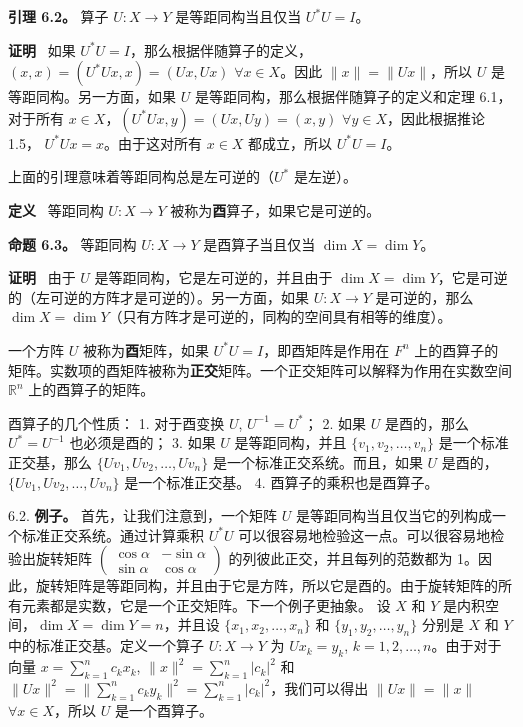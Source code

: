 \textbf{引理 6.2。} 算子 $U: X \to Y$ 是等距同构当且仅当 $U^*U = I$。

\textbf{证明}~ 如果 $U^*U = I$，那么根据伴随算子的定义，$(x, x) = (U^*Ux, x) = (Ux, Ux)$ $\forall x \in X$。因此 $\|x\| = \|Ux\|$，所以 $U$ 是等距同构。另一方面，如果 $U$ 是等距同构，那么根据伴随算子的定义和定理 6.1，对于所有 $x \in X$，$(U^*Ux, y) = (Ux, Uy) = (x, y)$ $\forall y \in X$，因此根据推论 1.5， $U^*Ux = x$。由于这对所有 $x \in X$ 都成立，所以 $U^*U = I$。

上面的引理意味着等距同构总是左可逆的（$U^*$ 是左逆）。

\textbf{定义}~ 等距同构 $U: X \to Y$ 被称为\textbf{酉}算子，如果它是可逆的。

\textbf{命题 6.3。} 等距同构 $U: X \to Y$ 是酉算子当且仅当 $\dim X = \dim Y$。

\textbf{证明}~ 由于 $U$ 是等距同构，它是左可逆的，并且由于 $\dim X = \dim Y$，它是可逆的（左可逆的方阵才是可逆的）。另一方面，如果 $U: X \to Y$ 是可逆的，那么 $\dim X = \dim Y$（只有方阵才是可逆的，同构的空间具有相等的维度）。

一个方阵 $U$ 被称为\textbf{酉}矩阵，如果 $U^*U = I$，即酉矩阵是作用在 $F^n$ 上的酉算子的矩阵。实数项的酉矩阵被称为\textbf{正交}矩阵。一个正交矩阵可以解释为作用在实数空间 $\mathbb{R}^n$ 上的酉算子的矩阵。

酉算子的几个性质：
1. 对于酉变换 $U$, $U^{-1} = U^*$；
2. 如果 $U$ 是酉的，那么 $U^* = U^{-1}$ 也必须是酉的；
3. 如果 $U$ 是等距同构，并且 $\{v_1, v_2, \dots, v_n\}$ 是一个标准正交基，那么 $\{Uv_1, Uv_2, \dots, Uv_n\}$ 是一个标准正交系统。而且，如果 $U$ 是酉的，$\{Uv_1, Uv_2, \dots, Uv_n\}$ 是一个标准正交基。
4. 酉算子的乘积也是酉算子。

6.2. \textbf{例子。} 首先，让我们注意到，一个矩阵 $U$ 是等距同构当且仅当它的列构成一个标准正交系统。通过计算乘积 $U^*U$ 可以很容易地检验这一点。可以很容易地检验出旋转矩阵 $\begin{pmatrix} \cos \alpha & -\sin \alpha \\ \sin \alpha & \cos \alpha \end{pmatrix}$ 的列彼此正交，并且每列的范数都为 1。因此，旋转矩阵是等距同构，并且由于它是方阵，所以它是酉的。由于旋转矩阵的所有元素都是实数，它是一个正交矩阵。下一个例子更抽象。
设 $X$ 和 $Y$ 是内积空间，$\dim X = \dim Y = n$，并且设 $\{x_1, x_2, \dots, x_n\}$ 和 $\{y_1, y_2, \dots, y_n\}$ 分别是 $X$ 和 $Y$ 中的标准正交基。定义一个算子 $U: X \to Y$ 为 $Ux_k = y_k$, $k = 1, 2, \dots, n$。由于对于向量 $x = \sum_{k=1}^n c_k x_k$, $\|x\|^2 = \sum_{k=1}^n |c_k|^2$ 和 $\|Ux\|^2 = \|\sum_{k=1}^n c_k y_k\|^2 = \sum_{k=1}^n |c_k|^2$，我们可以得出 $\|Ux\| = \|x\|$ $\forall x \in X$，所以 $U$ 是一个酉算子。


